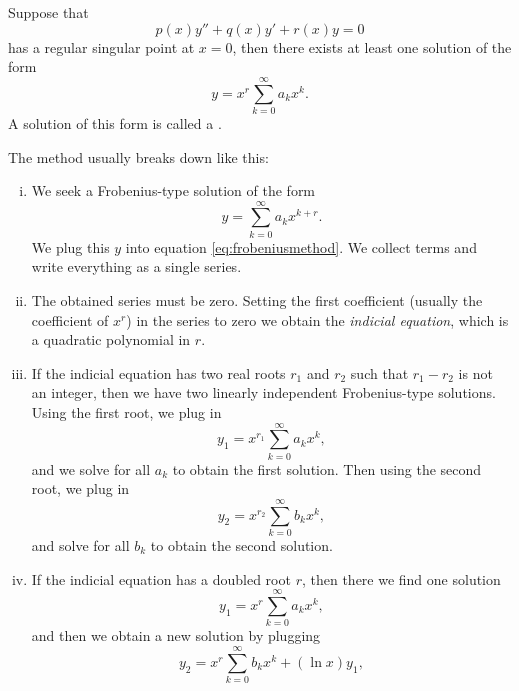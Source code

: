 \begin{theorem}
Suppose that 
\begin{equation} \label{eq:frobeniusmethod}
p(x) y'' + q(x) y' + r(x) y = 0
\end{equation}
has a regular singular point at $x=0$, then there exists at least
one solution of the form
\begin{equation*}
y = x^r \sum_{k=0}^\infty a_k x^k .
\end{equation*}
A solution of this form is called a
\emph{}.
\end{theorem}

\pagebreak[2]
The method usually breaks down like this:

\begin{enumerate}[(i)]
\item
We seek a Frobenius-type solution of the form
\begin{equation*}
y = \sum_{k=0}^\infty a_k x^{k+r} .
\end{equation*}
We plug this $y$ into equation \eqref{eq:frobeniusmethod}.  We collect
terms and write everything as a single series.
\item
The obtained series must be zero.  Setting the first
coefficient (usually the coefficient of $x^r$) in the series
to zero we obtain the
\emph{indicial equation}, which is a quadratic polynomial in $r$.
\item
If the indicial equation has two real roots $r_1$ and $r_2$
such that $r_1 - r_2$ is not an integer, then we have two linearly
independent Frobenius-type solutions.  Using the first root, we plug in
\begin{equation*}
y_1 = x^{r_1} \sum_{k=0}^\infty a_k x^{k} ,
\end{equation*}
and we solve for all $a_k$ to obtain the first solution.  Then
using the second root,
we plug in
\begin{equation*}
y_2 = x^{r_2} \sum_{k=0}^\infty b_k x^{k} ,
\end{equation*}
and solve for all $b_k$ to obtain the second solution.
\item
If the indicial equation has a doubled root $r$, then there we find 
one solution
\begin{equation*}
y_1 = x^{r} \sum_{k=0}^\infty a_k x^{k} ,
\end{equation*}
and then we obtain a new solution by plugging
\begin{equation*}
y_2 = x^{r} \sum_{k=0}^\infty b_k x^{k} + (\ln x) y_1 ,

\end{equation*}
\end{enumerate}
